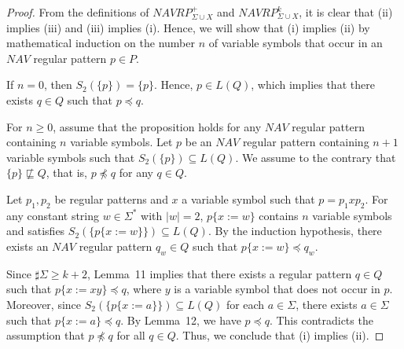 \begin{proof}
%
%
{\color{red} From the definitions of $\mathit{NAVRP}^+_{\Sigma\cup X}$ and $\mathit{NAVRP}^k_{\Sigma\cup X}$, it is clear that (ii) implies (iii) and (iii) implies (i). Hence, we will show that (i) implies (ii) by mathematical induction on the number $n$ of variable symbols that occur in an $\mathit{NAV}$ regular pattern $p \in P$.

If $n = 0$, then $S_2(\{p\}) = \{p\}$. Hence, $p \in L(Q)$, which implies that there exists $q \in Q$ such that $p \preceq q$.

For $n \ge 0$, assume that the proposition holds for any $\mathit{NAV}$ regular pattern containing $n$ variable symbols. Let $p$ be an $\mathit{NAV}$ regular pattern containing $n + 1$ variable symbols such that $S_2(\{p\}) \subseteq L(Q)$. We assume to the contrary that $\{p\} \not\sqsubseteq Q$, that is, $p \not\preceq q$ for any $q \in Q$.

Let $p_1, p_2$ be regular patterns and $x$ a variable symbol such that $p = p_1 x p_2$. For any constant string $w \in \Sigma^*$ with $|w| = 2$, $p\{x := w\}$ contains $n$ variable symbols and satisfies $S_2(\{p\{x := w\}\}) \subseteq L(Q)$. By the induction hypothesis, there exists an $\mathit{NAV}$ regular pattern $q_w \in Q$ such that $p\{x := w\} \preceq q_w$. 

Since $\sharp\Sigma \ge k + 2$, Lemma~11 implies that there exists a regular pattern $q \in Q$ such that $p\{x := xy\} \preceq q$, where $y$ is a variable symbol that does not occur in $p$. Moreover, since $S_2(\{p\{x := a\}\}) \subseteq L(Q)$ for each $a \in \Sigma$, there exists $a \in \Sigma$ such that $p\{x := a\} \preceq q$. By Lemma~12, we have $p \preceq q$. This contradicts the assumption that $p \not\preceq q$ for all $q \in Q$. Thus, we conclude that (i) implies (ii).
}
\end{proof}

